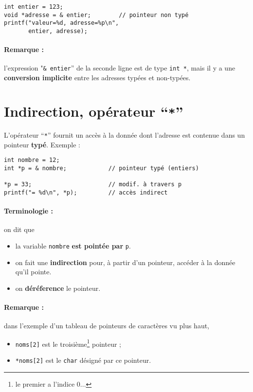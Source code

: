 \begin{lstlisting}[style=cextract]
int entier = 123;
void *adresse = & entier;        // pointeur non typé
printf("valeur=%d, adresse=%p\n",
       entier, adresse);
\end{lstlisting}

\paragraph{Remarque :} l'expression "\texttt{\& entier}'' de la
seconde ligne est de type \texttt{int *}, mais il y a une
\textbf{conversion
implicite} entre les adresses typées et non-typées.


\section{Indirection, opérateur ``\texttt{*}''}

L'opérateur ``\texttt{*}'' fournit un  accès à la donnée dont l'adresse est
contenue dans un pointeur \textbf{typé}. Exemple :

\begin{lstlisting}[style=cextract]
int nombre = 12;
int *p = & nombre;            // pointeur typé (entiers)

*p = 33;                      // modif. à travers p
printf("= %d\n", *p);         // accès indirect
\end{lstlisting}

\paragraph{Terminologie :} on dit que 
\begin{itemize}
\item  la variable \texttt{nombre} \textbf{est pointée par}
  \texttt{p}.
\item on fait une \textbf{indirection} pour, à partir d'un pointeur,
  accéder à la donnée qu'il pointe.
\item on \textbf{déréference} le pointeur.
\end{itemize}

\paragraph{Remarque :} dans l'exemple d'un tableau de pointeurs de caractères vu plus haut,
\begin{itemize}
\item \texttt{noms[2]} est le troisième\footnote{le premier a l'indice 0...} pointeur ;
  \item \texttt{*noms[2]} est le \texttt{char} désigné par ce pointeur.
\end{itemize}

